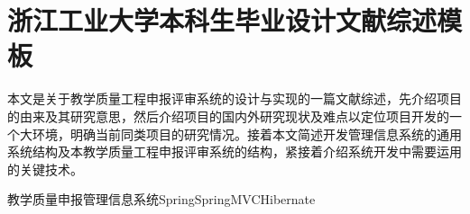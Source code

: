 
\chapter*{浙江工业大学本科生毕业设计文献综述模板}

本文是关于教学质量工程申报评审系统的设计与实现的一篇文献综述，先介绍项目的由来及其研究意思，然后介绍项目的国内外研究现状及难点以定位项目开发的一个大环境，明确当前同类项目的研究情况。接着本文简述开发管理信息系统的通用系统结构及本教学质量工程申报评审系统的结构，紧接着介绍系统开发中需要运用的关键技术。

教学质量\quad 申报\quad 管理信息系统\quad Spring\quad Spring\quad MVC\quad Hibernate
